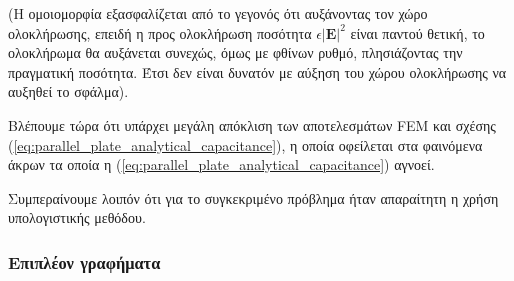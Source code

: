 \documentclass[10pt, letterpaper]{article}
\newcommand{\en}{\selectlanguage{english}}
\newcommand{\gr}{\selectlanguage{greek}}
\begin{document}
(Η ομοιομορφία εξασφαλίζεται από το γεγονός ότι αυξάνοντας τον χώρο ολοκλήρωσης, επειδή η προς ολοκλήρωση ποσότητα
$\epsilon |\mathbf{E}|^2$ είναι παντού θετική, το ολοκλήρωμα θα αυξάνεται συνεχώς, όμως με φθίνων ρυθμό,
πλησιάζοντας την πραγματική ποσότητα.
Έτσι δεν είναι δυνατόν με αύξηση του χώρου ολοκλήρωσης να αυξηθεί το σφάλμα).

Βλέπουμε τώρα ότι υπάρχει μεγάλη απόκλιση των αποτελεσμάτων \en FEM \gr και 
σχέσης (\ref{eq:parallel_plate_analytical_capacitance}), η οποία οφείλεται 
στα φαινόμενα άκρων τα οποία η (\ref{eq:parallel_plate_analytical_capacitance})
αγνοεί. 

Συμπεραίνουμε λοιπόν ότι για το συγκεκριμένο πρόβλημα ήταν απαραίτητη η χρήση 
υπολογιστικής μεθόδου.

\pagebreak
\subsubsection*{Επιπλέον γραφήματα}
\end{document}
